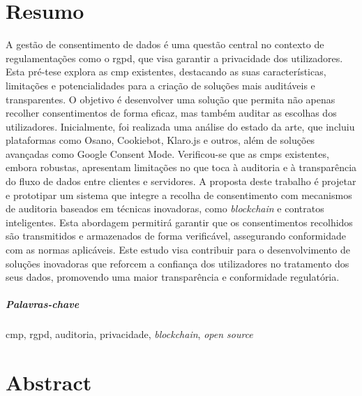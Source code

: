 \chapter*{Resumo}

A gestão de consentimento de dados é uma questão central no contexto de regulamentações como o \acrfull{rgpd}, que visa garantir a privacidade dos utilizadores. Esta pré-tese explora as \acrfull{cmp} existentes, destacando as suas características, limitações e potencialidades para a criação de soluções mais auditáveis e transparentes. O objetivo é desenvolver uma solução que permita não apenas recolher consentimentos de forma eficaz, mas também auditar as escolhas dos utilizadores. Inicialmente, foi realizada uma análise do estado da arte, que incluiu plataformas como Osano, Cookiebot, Klaro.js e outros, além de soluções avançadas como Google Consent Mode. Verificou-se que as \acrshort{cmp}s existentes, embora robustas, apresentam limitações no que toca à auditoria e à transparência do fluxo de dados entre clientes e servidores. A proposta deste trabalho é projetar e prototipar um sistema que integre a recolha de consentimento com mecanismos de auditoria baseados em técnicas inovadoras, como \textit{blockchain} e contratos inteligentes. Esta abordagem permitirá garantir que os consentimentos recolhidos são transmitidos e armazenados de forma verificável, assegurando conformidade com as normas aplicáveis. Este estudo visa contribuir para o desenvolvimento de soluções inovadoras que reforcem a confiança dos utilizadores no tratamento dos seus dados, promovendo uma maior transparência e conformidade regulatória.

\paragraph{Palavras-chave} \acrshort{cmp}, \acrshort{rgpd}, auditoria, privacidade, \textit{blockchain}, \textit{open source}

\cleardoublepage

\chapter*{Abstract}

